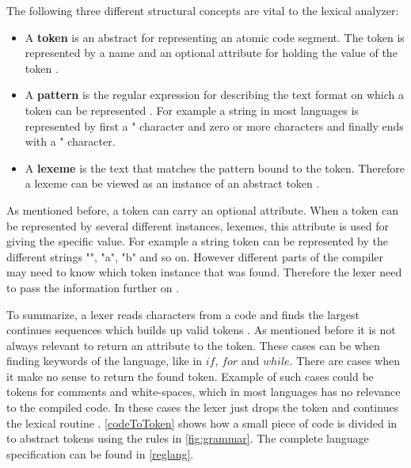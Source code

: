 The following three different structural concepts are vital to the lexical
analyzer:
\begin{itemize}
  \item A \textbf{token} is an abstract for representing an atomic code
  segment. The token is represented by a name and an optional attribute for
  holding the value of the token \cite{Aho2006}.
  \item A \textbf{pattern} is the regular expression for describing the
  text format on which a token can be represented \cite{Aho2006}. For example a
  string in most languages is represented by first a " character and zero or 
  more characters and finally ends with a " character.
  \item A \textbf{lexeme} is the text that matches the pattern bound to 
  the token. Therefore a lexeme can be viewed as an instance of an abstract 
  token \cite{Aho2006}.
\end{itemize}
As mentioned before, a token can carry an optional attribute. When a token can
be represented by several different instances, lexemes, this attribute is used
for giving the specific value. For example a string token can be represented by
the different strings "", "a", "b" and so on. However different parts of the
compiler may need to know which token instance that was found.
Therefore the lexer need to pass the information further on \cite{Aho2006}.

To summarize, a lexer reads characters from a code and finds the largest 
continues sequences which builds up valid tokens \cite{sebesta2012}. As 
mentioned before it is not always relevant to return an attribute to the token. 
These cases can be when finding keywords of the language, like in $if$, $for$
and $while$. There are cases when it make no sense to return the found token.
Example of such cases could be tokens for comments and white-spaces, which in 
most languages has no relevance to the compiled code. In these cases the lexer 
just drops the token and continues the lexical routine \cite{Aho2006}.
\cref{codeToToken} shows how a small piece of code is divided in to abstract
tokens using the rules in \cref{fig:grammar}. The complete language specification
can be found in \cref{reglang}.

\newpage

